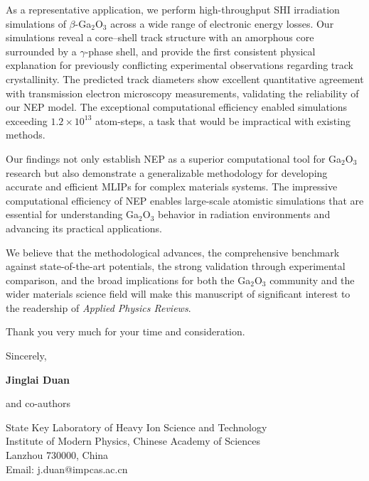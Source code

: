 \documentclass[12pt]{article}
\begin{document}
As a representative application, we perform high-throughput SHI irradiation simulations of $\beta$-Ga$_2$O$_3$ across a wide range of electronic energy losses. Our simulations reveal a core--shell track structure with an amorphous core surrounded by a $\gamma$-phase shell, and provide the first consistent physical explanation for previously conflicting experimental observations regarding track crystallinity. The predicted track diameters show excellent quantitative agreement with transmission electron microscopy measurements, validating the reliability of our NEP model. The exceptional computational efficiency enabled simulations exceeding $1.2\times10^{13}$ atom-steps, a task that would be impractical with existing methods.

Our findings not only establish NEP as a superior computational tool for Ga$_2$O$_3$ research but also demonstrate a generalizable methodology for developing accurate and efficient MLIPs for complex materials systems. The impressive computational efficiency of NEP enables large-scale atomistic simulations that are essential for understanding Ga$_2$O$_3$ behavior in radiation environments and advancing its practical applications.

We believe that the methodological advances, the comprehensive benchmark against state-of-the-art potentials, the strong validation through experimental comparison, and the broad implications for both the Ga$_2$O$_3$ community and the wider materials science field will make this manuscript of significant interest to the readership of \textit{Applied Physics Reviews}.

Thank you very much for your time and consideration.

\vspace{1em}

Sincerely,

\textbf{Jinglai Duan}

and co-authors

\vspace{1em}

\noindent
State Key Laboratory of Heavy Ion Science and Technology \\
Institute of Modern Physics, Chinese Academy of Sciences \\
Lanzhou 730000, China \\
Email: j.duan@impcas.ac.cn
\end{document}
